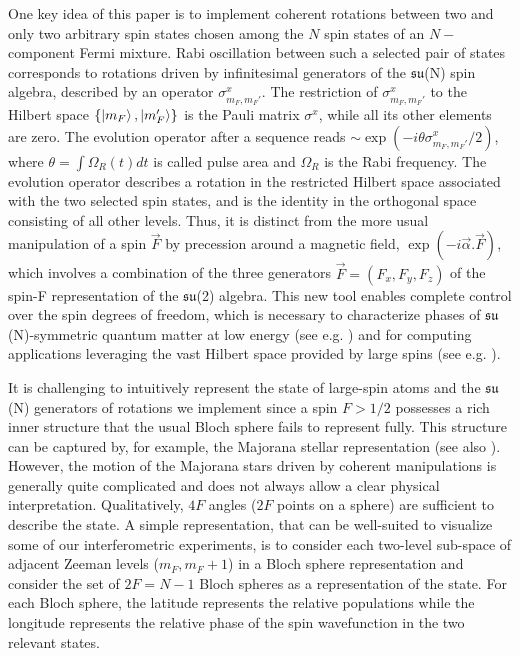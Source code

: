 One key idea of this paper is to implement coherent rotations between two and only two arbitrary spin states chosen among the $N$ spin states of an $N-$component Fermi mixture. Rabi oscillation between such a selected pair of states corresponds to rotations driven by infinitesimal generators of the $\mathfrak{su}$(N) spin algebra, described by an operator $\sigma^x_{m_F,m_F'}$. The restriction of $\sigma^x_{m_F,m_F'}$ to the Hilbert space $\{\ket{m_F} , \ket{m_F'} \}$ is the Pauli matrix $\sigma^x$, while all its other elements are zero. The evolution operator after a sequence reads  $\sim \exp{(- i \theta \sigma^x_{m_F,m_F'}/2 )}$, where $\theta = \int \Omega_R(t) dt$ is called pulse area and $\Omega_R$ is the Rabi frequency. The evolution operator describes a rotation in the restricted Hilbert space associated with the two selected spin states, and is the identity in the orthogonal space consisting of all other levels. Thus, it is distinct from the more usual manipulation of a spin $\vec F$ by precession around a magnetic field, $\exp(-i \vec \alpha . \vec F)$, which involves a combination of the three generators $\vec F = (F_x, F_y, F_z)$ of the spin-F representation of the $\mathfrak{su}$(2) algebra. This new tool enables complete control over the spin degrees of freedom, which is necessary to characterize phases of $\mathfrak{su}$(N)-symmetric quantum matter at low energy (see e.g. \cite{Chen2005esp}) and for computing applications leveraging the vast Hilbert space provided by large spins (see e.g. \cite{Kiktenko2015sqr}).

It is challenging to intuitively represent the state of large-spin atoms and the $\mathfrak{su}$(N) generators of rotations we implement since a spin $F>1/2$ possesses a rich inner structure that the usual Bloch sphere fails to represent fully. This structure can be captured by, for example, the Majorana stellar representation \cite{Majorana1932aoi} (see also \cite{Barnett2006cnp, Bruno2012qgp, Evrard2019ems}). However, the motion of the Majorana stars driven by coherent manipulations is generally quite complicated and does not always allow a clear physical interpretation. Qualitatively, $4F$ angles ($2F$ points on a sphere) are sufficient to describe the state. A simple representation, that can be well-suited to visualize some of our interferometric experiments, is to consider each two-level sub-space of adjacent Zeeman levels ($m_F, m_F+1$) in a Bloch sphere representation and consider the set of $2F = N-1$ Bloch spheres as a representation of the state. For each Bloch sphere, the latitude represents the relative populations while the longitude represents the relative phase of the spin wavefunction in the two relevant states. 


